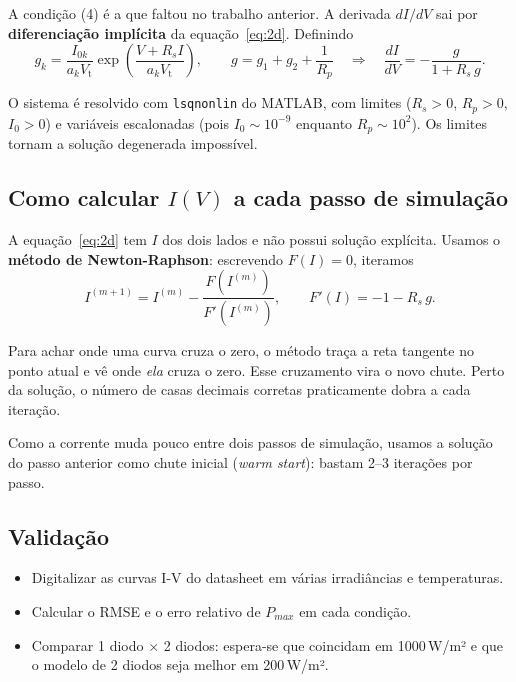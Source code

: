 \documentclass[11pt,a4paper]{article}
\newcommand{\Vt}{V_{\mathrm{t}}}
\begin{document}
A condição (4) é a que faltou no trabalho anterior. A derivada $dI/dV$ sai por
\textbf{diferenciação implícita} da equação~\eqref{eq:2d}. Definindo
\begin{equation}
g_k = \frac{I_{0k}}{a_k\Vt}\exp\!\left(\frac{V+R_sI}{a_k\Vt}\right),
\qquad g = g_1+g_2+\frac{1}{R_p}
\quad\Longrightarrow\quad
\frac{dI}{dV} = -\frac{g}{1+R_s\,g}.
\label{eq:didv}
\end{equation}

O sistema é resolvido com \texttt{lsqnonlin} do MATLAB, com limites ($R_s>0$, $R_p>0$,
$I_0>0$) e variáveis escalonadas (pois $I_0\sim10^{-9}$ enquanto $R_p\sim10^{2}$). Os limites
tornam a solução degenerada impossível.

\subsection{Como calcular $I(V)$ a cada passo de simulação}

A equação~\eqref{eq:2d} tem $I$ dos dois lados e não possui solução explícita. Usamos o
\textbf{método de Newton-Raphson}: escrevendo $F(I)=0$, iteramos
\begin{equation}
I^{(m+1)} = I^{(m)} - \frac{F(I^{(m)})}{F'(I^{(m)})},
\qquad F'(I) = -1 - R_s\,g.
\end{equation}

\begin{intuicao}
Para achar onde uma curva cruza o zero, o método traça a reta tangente no ponto atual e vê
onde \emph{ela} cruza o zero. Esse cruzamento vira o novo chute. Perto da solução, o número
de casas decimais corretas praticamente dobra a cada iteração.
\end{intuicao}

Como a corrente muda pouco entre dois passos de simulação, usamos a solução do passo anterior
como chute inicial (\emph{warm start}): bastam 2--3 iterações por passo.

\subsection{Validação}
\begin{itemize}
\item Digitalizar as curvas I-V do datasheet em várias irradiâncias e temperaturas.
\item Calcular o RMSE e o erro relativo de $P_{max}$ em cada condição.
\item Comparar 1 diodo $\times$ 2 diodos: espera-se que coincidam em 1000\,W/m² e que o
modelo de 2 diodos seja melhor em 200\,W/m².
\end{itemize}
\end{document}
